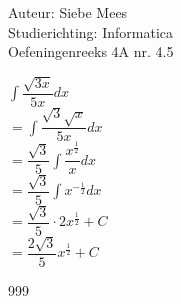 \documentclass[a4paper]{article}
\begin{document}
  
\noindent \large Auteur: Siebe Mees \\
\noindent \large Studierichting: Informatica\\
\noindent \large Oefeningenreeks 4A nr. 4.5\\

\medskip

\normalsize

$ \displaystyle\int \dfrac{\sqrt{3x}}{5x}dx $\\

$ = \displaystyle\int \dfrac{\sqrt{3}\sqrt{x}}{5x}dx $\\

$ = \dfrac{\sqrt{3}}{5}\displaystyle\int \dfrac{x^{\tfrac{1}{2}}}{x}dx $\\

$ = \dfrac{\sqrt{3}}{5}\displaystyle\int x^{-\tfrac{1}{2}}dx $\\

$ = \dfrac{\sqrt{3}}{5}\cdot 2x^{\tfrac{1}{2}} + C $\\

$ = \dfrac{2\sqrt{3}}{5}x^{\tfrac{1}{2}} + C $\\

\begin{thebibliography}{999}
\end{thebibliography}
\end{document}
